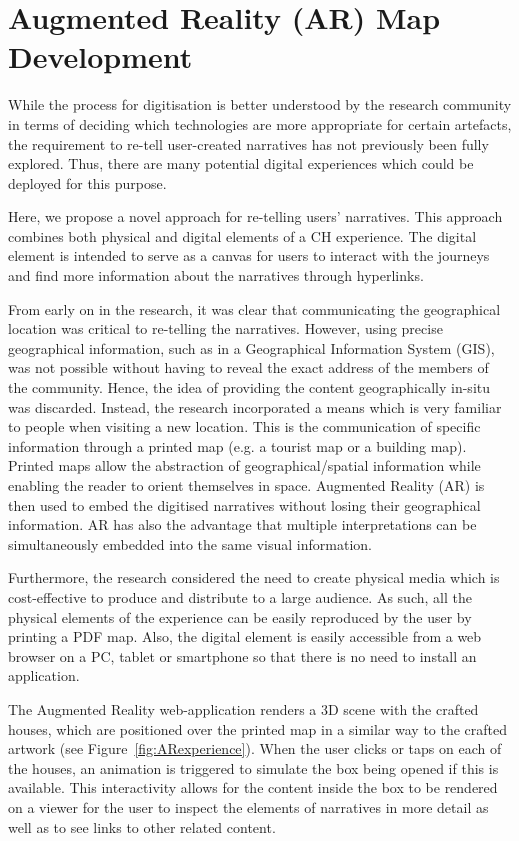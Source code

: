 \documentclass[acmlarge,screen,dvipsnames]{acmart}
\begin{document}
\section{Augmented Reality (AR) Map Development} \label{tech} 

While the process for digitisation is better understood by the research
community in terms of deciding which technologies are more appropriate for certain artefacts, the requirement to re-tell user-created narratives has not previously been fully
explored. Thus, there are many potential digital experiences which could be
deployed for this purpose. 

Here, we propose a novel approach for re-telling users' narratives. This approach
combines both physical and digital elements of a CH experience. The digital element
is intended to serve as a canvas for users to interact with the journeys and
find more information about the narratives through hyperlinks. 

From early on in the research, it was clear that communicating the
geographical location was critical to re-telling the narratives. However,
using precise geographical information, such as in a Geographical Information
System (GIS), was not possible without having to reveal the exact address of the members of the community. Hence, the idea of providing the
content geographically in-situ was discarded. Instead, the research
incorporated a means which is very familiar to people when visiting a new
location. This is the communication of specific information through a printed
map (e.g. a tourist map or a building map). Printed maps allow the
abstraction of geographical/spatial information while enabling the reader to
orient themselves in space. Augmented Reality (AR) is then used to embed
the digitised narratives without losing their geographical information. AR has also the advantage that multiple interpretations can be simultaneously embedded into the same visual information. 

Furthermore, the research considered the need to create physical media which is
cost-effective to produce and distribute to a large audience. As such, all
the physical elements of the experience can be easily reproduced by the user by
printing a PDF map. Also, the digital element is easily accessible from a
web browser on a PC, tablet or smartphone so that there is no need to install an application. 

\color{blue}
The Augmented Reality web-application renders a 3D scene with the crafted
houses, which are positioned over the printed map in a similar way to the
crafted artwork (see Figure~\ref{fig:ARexperience}). When the user clicks or
taps on each of the houses, an animation is triggered to simulate the box
being opened if this is available. This interactivity allows for the content inside the box to be rendered on a viewer for the
user to inspect the elements of narratives in more detail as well as to see links to other related content. 
\color{black}
\end{document}
